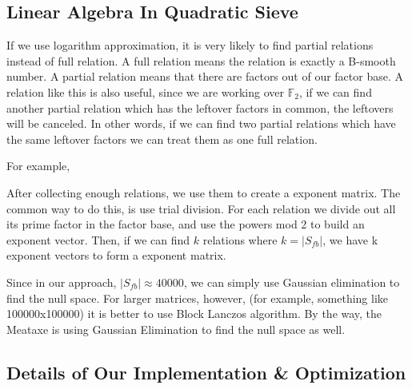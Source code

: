 \documentclass[12pt]{article} %
\begin{document}
	\subsection {Linear Algebra In Quadratic Sieve}
	
	If we use logarithm approximation, it is very likely to find partial relations instead of full relation. A full relation means the relation is exactly a B-smooth number. A partial relation means that there are factors out of our factor base. A relation like this is also useful, since we are working over $\mathbb{F}_2$, if we can find another partial relation which has the leftover factors in common, the leftovers will be canceled. In other words, if we can find two partial relations which have the same leftover factors we can treat them as one full relation.
	
	For example, 
	
	After collecting enough relations, we use them to create a exponent matrix. The common way to do this, is use trial division. For each relation we divide out all its  prime factor in the factor base, and use the powers mod 2 to build an exponent vector. 
	Then, if we can find $k$ relations where $k = |S_{fb}|$, we have k exponent vectors to form a exponent matrix. 
	
	Since in our approach, $|S_{fb}|\approx 40000$, we can simply use Gaussian elimination to find the null space. For larger matrices, however, (for example, something like 100000x100000) it is better to use Block Lanczos algorithm. By the way, the Meataxe is using Gaussian Elimination to find the null space as well.
	
	\subsection {Details of Our Implementation \& Optimization}
	
\end{document}

